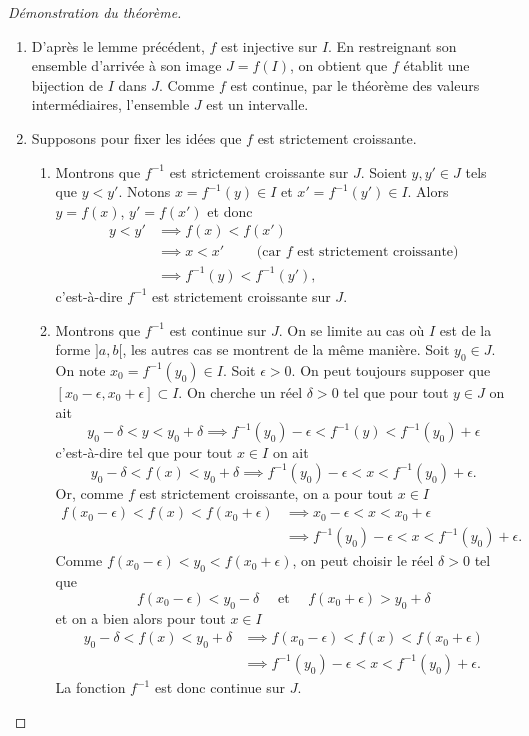 \documentclass[class=report,crop=false]{standalone}
\begin{document}
\begin{proof}[Démonstration du théorème]
~
\begin{enumerate}
\item D'après le lemme précédent, $f$ est injective sur $I$. En restreignant son
ensemble d'arrivée à son image $J=f(I)$, on obtient que $f$ établit une bijection
de $I$ dans $J$. Comme $f$ est continue, par le théorème des valeurs intermédiaires,
l'ensemble $J$ est un intervalle.
\item Supposons pour fixer les idées que $f$ est strictement croissante.
\begin{enumerate}
\item Montrons que $f^{-1}$ est strictement croissante sur $J$. Soient $y,y'\in J$ tels que $y<y'$. Notons $x=f^{-1}(y)\in I$ et $x'=f^{-1}(y')\in I$. Alors $y=f(x)$, $y'=f(x')$ et donc
\begin{align*}
y<y'& \implies f(x)<f(x')\\
	& \implies x<x' \qquad \text{ (car $f$ est strictement croissante)}\\
	& \implies f^{-1}(y)<f^{-1}(y'),
\end{align*}
c'est-à-dire $f^{-1}$ est strictement croissante sur $J$.
\item Montrons que $f^{-1}$ est continue sur $J$. On se limite au cas où $I$ est de la forme $]a,b[$, les autres cas se montrent de la même manière. Soit $y_0\in J$. On note $x_0=f^{-1}(y_0)\in I$. Soit $\epsilon>0$. On peut toujours supposer que $[x_0-\epsilon,x_0+\epsilon]\subset I$. On cherche un réel $\delta>0$ tel que pour tout $y\in J$ on ait
\[
y_0-\delta<y<y_0+\delta \implies f^{-1}(y_0)-\epsilon<f^{-1}(y)<f^{-1}(y_0)+\epsilon
\]
c'est-à-dire tel que pour tout $x\in I$ on ait
\[
y_0-\delta<f(x)<y_0+\delta \implies f^{-1}(y_0)-\epsilon<x<f^{-1}(y_0)+\epsilon.
\]
Or, comme $f$ est strictement croissante, on a pour tout $x\in I$
\begin{align*}
f(x_0-\epsilon)<f(x)<f(x_0+\epsilon) & \implies x_0-\epsilon<x<x_0+\epsilon\\
& \implies f^{-1}(y_0)-\epsilon<x<f^{-1}(y_0)+\epsilon.
\end{align*}
Comme $f(x_0-\epsilon)<y_0<f(x_0+\epsilon) $, on peut choisir le réel $\delta>0$ tel que
\[
f(x_0-\epsilon)<y_0-\delta \quad \text{ et } \quad f(x_0+\epsilon) > y_0+\delta
\]
et on a bien alors pour tout $x\in I$
\begin{align*}
y_0-\delta<f(x)<y_0+\delta & \implies f(x_0-\epsilon)<f(x)<f(x_0+\epsilon)\\
& \implies f^{-1}(y_0)-\epsilon<x<f^{-1}(y_0)+\epsilon.
\end{align*}
La fonction $f^{-1}$ est donc continue sur $J$.
\end{enumerate}
\end{enumerate}
\end{proof}
\end{document}

